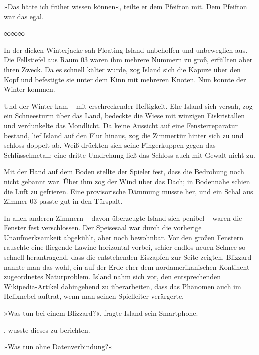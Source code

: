 
»Das hätte ich früher wissen können«, teilte er dem Pfeifton mit. Dem Pfeifton war das egal.

\begin{center}
∞∞∞
\end{center}

In der dicken Winterjacke sah Floating Island unbeholfen und unbeweglich aus. Die Fellstiefel aus Raum 03 waren ihm mehrere Nummern zu groß, erfüllten aber ihren Zweck. Da es schnell kälter wurde, zog Island sich die Kapuze über den Kopf und befestigte sie unter dem Kinn mit mehreren Knoten. Nun konnte der Winter kommen.

Und der Winter kam – mit erschreckender Heftigkeit. Ehe Island sich versah, zog ein Schneesturm über das Land, bedeckte die Wiese mit winzigen Eiskristallen und verdunkelte das Mondlicht. Da keine Aussicht auf eine Fensterreparatur bestand, lief Island auf den Flur hinaus, zog die Zimmertür hinter sich zu und schloss doppelt ab. Weiß drückten sich seine Fingerkuppen gegen das Schlüsselmetall; eine dritte Umdrehung ließ das Schloss auch mit Gewalt nicht zu.

Mit der Hand auf dem Boden stellte der Spieler fest, dass die Bedrohung noch nicht gebannt war. Über ihm zog der Wind über das Dach; in Bodennähe schien die Luft zu gefrieren. Eine provisorische Dämmung musste her, und ein Schal aus Zimmer 03 passte gut in den Türspalt.

In allen anderen Zimmern – davon überzeugte Island sich penibel – waren die Fenster fest verschlossen. Der Speisesaal war durch die vorherige Unaufmerksamkeit abgekühlt, aber noch bewohnbar. Vor den großen Fenstern rauschte eine fliegende Lawine horizontal vorbei, schier endlos neuen Schnee so schnell herantragend, dass die entstehenden Eiszapfen zur Seite zeigten. Blizzard nannte man das wohl, ein auf der Erde eher dem nordamerikanischen Kontinent zugeordnetes Naturproblem. Island nahm sich vor, den entsprechenden Wikipedia-Artikel dahingehend zu überarbeiten, dass das Phänomen auch im Helixnebel auftrat, wenn man seinen Spielleiter verärgerte.

»Was tun bei einem Blizzard?«, fragte Island sein Smartphone.

, wusste dieses zu berichten.

»Was tun ohne Datenverbindung?«


